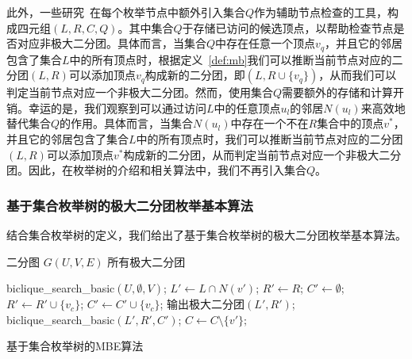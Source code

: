 此外，一些研究~\cite{iMBEA14,ooMBE22}在每个枚举节点中额外引入集合$Q$作为辅助节点检查的工具，构成四元组$(L,R,C,Q)$。其中集合$Q$于存储已访问的候选顶点，以帮助检查节点是否对应非极大二分团。具体而言，当集合$Q$中存在任意一个顶点$v_q$，并且它的邻居包含了集合$L$中的所有顶点时，根据定义~\ref{def:mb}我们可以推断当前节点对应的二分团$(L,R)$可以添加顶点$v_q$构成新的二分团，即$(L, R\cup\{v_q\})$，从而我们可以判定当前节点对应一个非极大二分团。然而，使用集合$Q$需要额外的存储和计算开销。幸运的是，我们观察到可以通过访问$L$中的任意顶点$u_l$的邻居$N(u_l)$来高效地替代集合$Q$的作用。具体而言，当集合$N(u_l)$中存在一个不在$R$集合中的顶点$v^*$，并且它的邻居包含了集合$L$中的所有顶点时，我们可以推断当前节点对应的二分团$(L,R)$可以添加顶点$v^*$构成新的二分团，从而判定当前节点对应一个非极大二分团。因此，在枚举树的介绍和相关算法中，我们不再引入集合$Q$。

\subsubsection{基于集合枚举树的极大二分团枚举基本算法}
\label{subsec:algorithm}
  结合集合枚举树的定义，我们给出了基于集合枚举树的极大二分团枚举基本算法。

\begin{algorithm}[H]
    \begin{algorithmic}[1]
        \normalsize
        \REQUIRE 二分图 $G(U,V,E)$
        \ENSURE 所有极大二分团
        
        \renewcommand{\algorithmicwhile}{\textbf{procedure}}
        \renewcommand{\algorithmicdo}{\textbf{:}}


        \STATE \textsf{biclique\_search\_basic}$(U,\emptyset,V)$;
        \renewcommand{\algorithmicdo}{\textbf{do}}
            \STATE $L' \leftarrow L \cap N(v')$; $R'\leftarrow R$; $C' \leftarrow \emptyset$;
                \STATE $R' \leftarrow R' \cup \{v_c\}$;
                \STATE $C' \leftarrow C' \cup \{v_c\}$;
              \ENDIF
            \ENDFOR
              \STATE 输出极大二分团$(L', R')$;
              \STATE \textsf{biclique\_search\_basic}$(L',R',C')$;
            \ENDIF
            \STATE $C \leftarrow C \setminus \{v'\}; $
          \ENDFOR

        \ENDWHILE

    \end{algorithmic}
    \caption{基于集合枚举树的MBE算法}
    \label{alg:se_mbe}
\end{algorithm}

